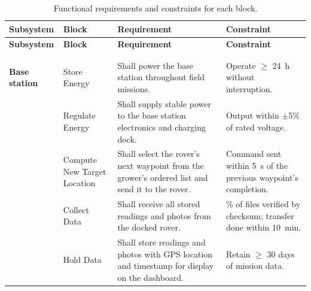 \documentclass[12pt, letterpaper]{article}
\begin{document}
{\footnotesize
\setlength{\extrarowheight}{2pt}
\begin{longtable}{@{}>{\raggedright\arraybackslash}p{2.2cm} >{\raggedright\arraybackslash}p{3.0cm} >{\raggedright\arraybackslash}p{5.6cm} >{\raggedright\arraybackslash}p{4.2cm}@{}}
    \toprule
    \textbf{Subsystem} & \textbf{Block} & \textbf{Requirement} & \textbf{Constraint} \\
    \midrule[0.8pt]
    \endfirsthead
    
    \toprule
    \textbf{Subsystem} & \textbf{Block} & \textbf{Requirement} & \textbf{Constraint} \\
    \midrule[0.8pt]
    \endhead
    
    \midrule
    \multicolumn{4}{r}{\emph{Continued on next page}} \\
    \endfoot
    
    \bottomrule
    \bottomrule
    \addlinespace[4pt]
    \caption{Functional requirements and constraints for each block.}
    \label{tab:func_req} \\
    \endlastfoot
    
    \textbf{Base station} & Store Energy & Shall power the base station throughout field missions. & Operate $\geq$ 24~h without interruption. \\
    \cmidrule[0.2pt](l){2-4}
     & Regulate Energy & Shall supply stable power to the base station electronics and charging dock. & Output within $\pm$5\% of rated voltage. \\
    \cmidrule[0.2pt](l){2-4}
     & Compute New Target Location & Shall select the rover's next waypoint from the grower's ordered list and send it to the rover. & Command sent within 5~s of the previous waypoint's completion. \\
    \cmidrule[0.2pt](l){2-4}
     & Collect Data & Shall receive all stored readings and photos from the docked rover. & 100\% of files verified by checksum; transfer done within 10~min. \\
    \cmidrule[0.2pt](l){2-4}
     & Hold Data & Shall store readings and photos with GPS location and timestamp for display on the dashboard. & Retain $\geq$ 30 days of mission data. \\
    \midrule
    

\end{longtable}}
\end{document}
